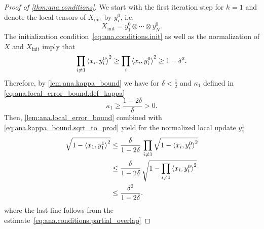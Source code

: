 \begin{proof}[Proof of \cref{thm:ana.conditions}]
  We start with the first iteration step for $h = 1$ and denote the local tensors of $X_\mathrm{init}$ by $y_i^0$, i.e.
  \[
    X_\mathrm{init} = y_1^0 \otimes \cdots \otimes y_N^0.
  \]
  The initialization condition~\eqref{eq:ana.conditions.init} as well as the normalization of $X$ and $X_\mathrm{init}$ imply that
  \[
    \label{eq:ana.conditions.partial_overlap}
    \prod_{i \neq 1} \braket{x_i, y_i^0}^2 \ge \prod_{i} \braket{x_i, y_i^0}^2 \ge 1 - \delta^2.
  \]
  Therefore, by \cref{lem:ana.kappa_bound} we have for $\delta < \frac{1}{2}$ and $\kappa_1$ defined in \cref{eq:ana.local_error_bound.def_kappa}
  \[
    \kappa_1 \ge \frac{1 - 2\delta}{\delta} > 0.
  \]
  Then, \cref{lem:ana.local_error_bound} combined with \cref{eq:ana.kappa_bound.sqrt_to_prod} yield for the normalized local update $y_1^1$
  \begin{align}
    \sqrt{1 - \Braket{x_1, y_1^1}^2}
    &\le \frac{\delta}{1 - 2\delta} \, \prod_{i \neq 1} \sqrt{1 - \Braket{x_i, y_i^0}^2} \\
    &\le \frac{\delta}{1 - 2\delta} \, \sqrt{1 - \prod_{i \neq 1} \Braket{x_i, y_i^0}^2} \\
    &\le \frac{\delta^2}{1 - 2\delta}.
  \end{align}
  where the last line follows from the estimate~\eqref{eq:ana.conditions.partial_overlap}
\end{proof}
